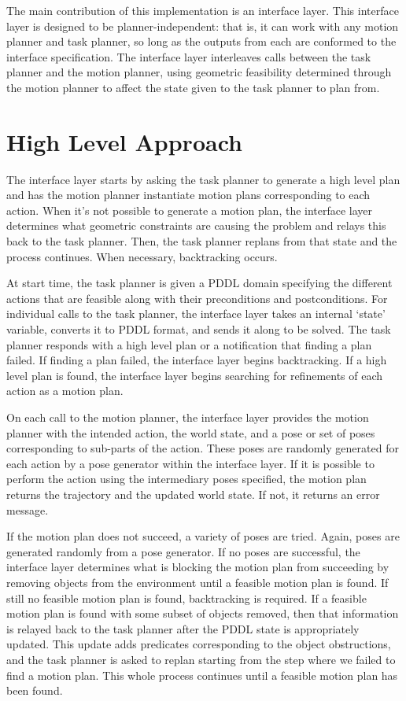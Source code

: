 \documentclass[12pt]{article}
\begin{document}
The main contribution of this implementation is an interface layer.  
This interface layer is designed to be planner-independent: that is, it can work with any motion planner and task planner, so long as the outputs from each are conformed to the interface specification.  
The interface layer interleaves calls between the task planner and the motion planner, using geometric feasibility determined through the motion planner to affect the state given to the task planner to plan from.




\section{High Level Approach}

The interface layer starts by asking the task planner to generate a high level plan and has the motion planner instantiate motion plans corresponding to each action.  
When it's not possible to generate a motion plan, the interface layer determines what geometric constraints are causing the problem and relays this back to the task planner.  
Then, the task planner replans from that state and the process continues.  
When necessary, backtracking occurs.
 
At start time, the task planner is given a PDDL domain specifying the different actions that are feasible along with their preconditions and postconditions.  
For individual calls to the task planner, the interface layer takes an internal `state' variable, converts it to PDDL format, and sends it along to be solved.  
The task planner responds with a high level plan or a notification that finding a plan failed.  
If finding a plan failed, the interface layer begins backtracking.  
If a high level plan is found, the interface layer begins searching for refinements of each action as a motion plan.

On each call to the motion planner, the interface layer provides the motion planner with the intended action, the world state, and a pose or set of poses  
corresponding to sub-parts of the action. These poses are randomly generated for each action by a pose generator within the interface layer. 
If it is possible to perform the action using the intermediary poses specified, the motion plan returns the trajectory and the updated world state.  
If not, it returns an error message.

If the motion plan does not succeed, a variety of poses are tried.  
Again, poses are generated randomly from a pose generator.  
If no poses are successful, the interface layer determines what is blocking the motion plan from succeeding by removing objects from the environment until a feasible motion plan is found.  
If still no feasible motion plan is found, backtracking is required.  
If a feasible motion plan is found with some subset of objects removed, then that information is relayed back to the task planner after the PDDL state is appropriately updated.
This update adds predicates corresponding to the object obstructions, and the task planner is asked to replan starting from the step where we failed to find a motion plan. This whole process continues until a feasible motion plan has been found.  
\end{document}
